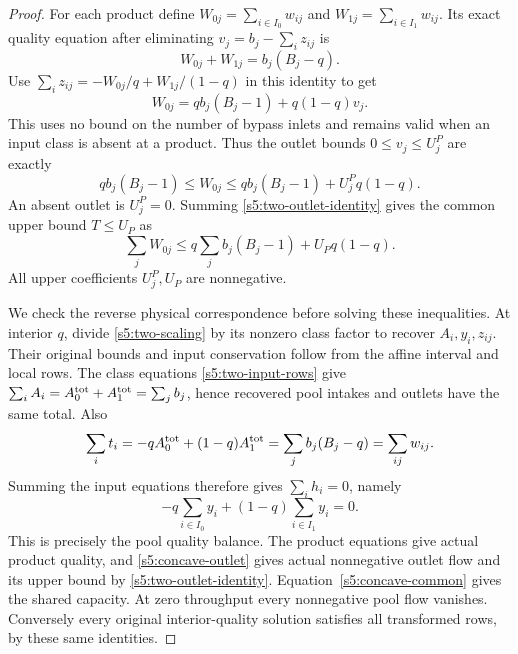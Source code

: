 \begin{proof}
For each product define
$W_{0j}=\sum_{i\in I_0}w_{ij}$ and
$W_{1j}=\sum_{i\in I_1}w_{ij}$. Its exact quality equation after
eliminating $v_j=b_j-\sum_i z_{ij}$ is
\begin{equation}
 W_{0j}+W_{1j}=b_j(B_j-q).
 \label{s5:two-output}
\end{equation}
Use $\sum_i z_{ij}=-W_{0j}/q+W_{1j}/(1-q)$ in this identity to get
\begin{equation}
 W_{0j}=q b_j(B_j-1)+q(1-q)v_j.
 \label{s5:two-outlet-identity}
\end{equation}
This uses no bound on the number of bypass inlets and remains valid
when an input class is absent at a product. Thus the outlet bounds
$0\le v_j\le U_j^P$ are exactly
\begin{equation}
 q b_j(B_j-1)\le W_{0j}\le
        q b_j(B_j-1)+U_j^P q(1-q).
 \label{s5:concave-outlet}
\end{equation}
An absent outlet is $U_j^P=0$. Summing
\eqref{s5:two-outlet-identity} gives the common upper bound $T\le U_P$
as
\begin{equation}
 \sum_jW_{0j}\le q\sum_jb_j(B_j-1)+U_Pq(1-q).
 \label{s5:concave-common}
\end{equation}
All upper coefficients $U_j^P,U_P$ are nonnegative.

We check the reverse physical correspondence before solving these
inequalities. At interior $q$, divide \eqref{s5:two-scaling} by its
nonzero class factor to recover $A_i,y_i,z_{ij}$. Their original bounds
and input conservation follow from the affine interval and local rows.
The class equations \eqref{s5:two-input-rows} give
$\sum_i A_i=A_0^{\rm tot}+A_1^{\rm tot}=\sum_jb_j$, hence recovered
pool intakes and outlets have the same total. Also
\[
 \sum_i t_i=-q A_0^{\rm tot}+(1-q)A_1^{\rm tot}
       =\sum_jb_j(B_j-q)=\sum_{ij}w_{ij}.
\]
Summing the input equations therefore gives $\sum_i h_i=0$, namely
\[
 -q\sum_{i\in I_0}y_i+(1-q)\sum_{i\in I_1}y_i=0.
\]
This is precisely the pool quality balance. The product equations give
actual product quality, and \eqref{s5:concave-outlet} gives actual
nonnegative outlet flow and its upper bound by
\eqref{s5:two-outlet-identity}. Equation~\eqref{s5:concave-common}
gives the shared capacity. At zero throughput every nonnegative pool
flow vanishes. Conversely every original interior-quality solution
satisfies all transformed rows, by these same identities.


\end{proof}
